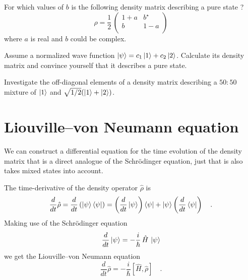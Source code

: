 \begin{questions}

\item For which values of $b$ is the following density matrix describing a pure state ?
\begin{equation*}
 \rho = \frac{1}{2} \, \begin{pmatrix}
1+a & b^\star \\ b & 1-a \\
 \end{pmatrix} 
\end{equation*}
where $a$ is real and $b$ could be complex.

\item Assume a normalized wave function $\ket{\psi} = c_1 \ket{1} + c_2 \ket{2}$. Calculate its density matrix and convince yourself that it describes a pure state.

\item Investigate the off-diagonal elements of a density matrix describing a $50:50$ mixture of $\ket{1}$ and $\sqrt{1/2}(\ket{1} + \ket{2})$. \label{q:rabi_coherence_mixture}


\end{questions}




\section{Liouville--von Neumann equation}

We can construct a differential equation for the time evolution of the density matrix that is a direct analogue of the Schrödinger equation, just that is also takes mixed states into account.

The time-derivative of the density operator $\hat{\rho}$ is
\begin{equation}
 \frac{d}{dt} \hat{\rho}= \frac{d}{dt} \left( \ket{\psi} \bra{\psi} \right) 
 =  \left( \frac{d}{dt}  \ket{\psi} \right) \bra{\psi} 
 + \ket{\psi} \left( \frac{d}{dt}  \bra{\psi} \right)  \quad .
\end{equation}
Making use of the Schrödinger equation
\begin{equation}
 \frac{d}{dt} \ket{\psi} = - \frac{i}{\hbar} \, \hat{H} \, \ket{\psi}
\end{equation}
we get the Liouville--von Neumann equation
\begin{equation}
 \frac{d}{dt} \hat{\rho} = - \frac{i}{\hbar} 
 \left[ \hat{H} ,\hat{\rho} \right]  \quad .
\end{equation}

